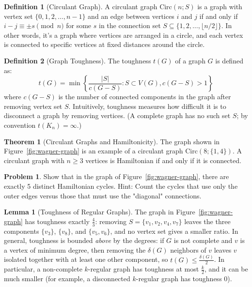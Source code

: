 \documentclass{article}
\theoremstyle{definition}
\newtheorem{problem}{Problem}
\newtheorem{theorem}{Theorem}
\newtheorem{lemma}{Lemma}
\newtheorem{definition}{Definition}
\begin{document}
\begin{definition}[Circulant Graph]
A circulant graph $\text{Circ}(n; S)$ is a graph with vertex set $\{0, 1, 2, \ldots, n-1\}$ and an edge between vertices $i$ and $j$ if and only if $i - j \equiv \pm s \pmod{n}$ for some $s$ in the connection set $S \subseteq \{1, 2, \ldots, \lfloor n/2 \rfloor\}$. In other words, it's a graph where vertices are arranged in a circle, and each vertex is connected to specific vertices at fixed distances around the circle.
\end{definition}

\begin{definition}[Graph Toughness]
The toughness $t(G)$ of a graph $G$ is defined as:
\[t(G) = \min \left\{\frac{|S|}{c(G-S)} : S \subset V(G), c(G-S) > 1 \right\}\]
where $c(G-S)$ is the number of connected components in the graph after removing vertex set $S$. Intuitively, toughness measures how difficult it is to disconnect a graph by removing vertices. (A complete graph has no such set $S$; by convention $t(K_n) = \infty$.)
\end{definition}

\begin{theorem}[Circulant Graphs and Hamiltonicity]
The graph shown in Figure~\ref{fig:wagner-graph} is an example of a circulant graph $\text{Circ}(8;\{1,4\})$. A circulant graph with $n \geq 3$ vertices is Hamiltonian if and only if it is connected.
\end{theorem}

\begin{problem}
Show that in the graph of Figure~\ref{fig:wagner-graph}, there are exactly 5 distinct Hamiltonian cycles. Hint: Count the cycles that use only the outer edges versus those that must use the "diagonal" connections.
\end{problem}

\begin{lemma}[Toughness of Regular Graphs]
The graph in Figure~\ref{fig:wagner-graph} has toughness exactly $\frac{4}{3}$: removing $S = \{v_1, v_2, v_4, v_7\}$ leaves the three components $\{v_3\}$, $\{v_8\}$, and $\{v_5, v_6\}$, and no vertex set gives a smaller ratio. In general, toughness is bounded \emph{above} by the degrees: if $G$ is not complete and $v$ is a vertex of minimum degree, then removing the $\delta(G)$ neighbors of $v$ leaves $v$ isolated together with at least one other component, so $t(G) \leq \frac{\delta(G)}{2}$. In particular, a non-complete $k$-regular graph has toughness at most $\frac{k}{2}$, and it can be much smaller (for example, a disconnected $k$-regular graph has toughness $0$).
\end{lemma}
\end{document}
